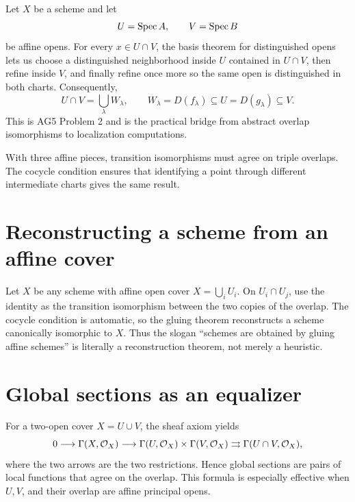 Let $X$ be a scheme and let
\[
U=\operatorname{Spec} A,\qquad V=\operatorname{Spec} B
\]
be affine opens.  For every $x\in U\cap V$, the basis theorem for distinguished opens lets us
choose a distinguished neighborhood inside $U$ contained in $U\cap V$, then refine inside $V$,
and finally refine once more so the same open is distinguished in both charts.  Consequently,
\[
\boxed{
U\cap V=\bigcup_\lambda W_\lambda,
\qquad
W_\lambda=D(f_\lambda)\subseteq U
=D(g_\lambda)\subseteq V.
}
\]
This is AG5 Problem 2 and is the practical bridge from abstract overlap isomorphisms to
localization computations.



\begin{example}\label{ex:vi20-expand-03}
With three affine pieces, transition isomorphisms must agree on triple overlaps.  The cocycle condition ensures that identifying a point through different intermediate charts gives the same result.
\end{example}
\section{Reconstructing a scheme from an affine cover}

Let $X$ be any scheme with affine open cover $X=\bigcup_i U_i$.  On $U_i\cap U_j$, use the identity
as the transition isomorphism between the two copies of the overlap.  The cocycle condition is
automatic, so the gluing theorem reconstructs a scheme canonically isomorphic to $X$.
Thus the slogan ``schemes are obtained by gluing affine schemes'' is literally a reconstruction
theorem, not merely a heuristic.

\section{Global sections as an equalizer}

For a two-open cover $X=U\cup V$, the sheaf axiom yields
\[
0\longrightarrow\Gamma(X,\mathcal O_X)
\longrightarrow\Gamma(U,\mathcal O_X)\times\Gamma(V,\mathcal O_X)
\rightrightarrows\Gamma(U\cap V,\mathcal O_X),
\]
where the two arrows are the two restrictions.  Hence global sections are pairs of local functions
that agree on the overlap.  This formula is especially effective when $U,V$, and their overlap are
affine principal opens.

